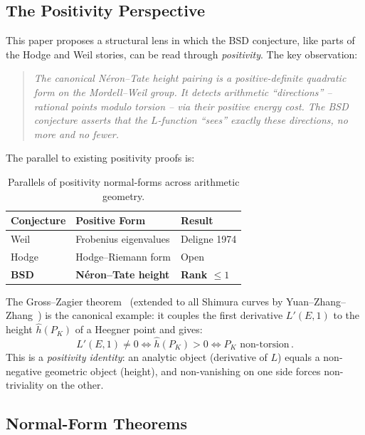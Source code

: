 \documentclass[aps,prd,twocolumn,superscriptaddress,nofootinbib,floatfix]{revtex4-2}
\theoremstyle{definition}
\theoremstyle{remark}
\begin{document}
\subsection{The Positivity Perspective}

This paper proposes a structural lens in which the BSD conjecture, like parts of the Hodge and Weil stories, can be read through \textit{positivity}. The key observation:

\begin{quote}
\textit{The canonical Néron--Tate height pairing is a positive-definite quadratic form on the Mordell\allowbreak--\allowbreak Weil group. It detects arithmetic ``directions'' -- rational points modulo torsion -- via their positive energy cost. The BSD conjecture asserts that the $L$-function ``sees'' exactly these directions, no more and no fewer.}
\end{quote}

The parallel to existing positivity proofs is:

\begin{table}[htbp]
\centering
\caption{Parallels of positivity normal-forms across arithmetic geometry.}
\label{tab:positivity_parallels}
\begin{tabular*}{\columnwidth}{@{\extracolsep{\fill}}lll@{}}
\toprule
\textbf{Conjecture} & \textbf{Positive Form} & \textbf{Result} \\
\midrule
Weil & Frobenius eigenvalues & Deligne 1974 \\
\addlinespace
Hodge & Hodge--Riemann form & Open \\
\addlinespace
\textbf{BSD} & \textbf{Néron--Tate height} & \textbf{Rank $\leq 1$} \\
\bottomrule
\end{tabular*}
\end{table}

The Gross--Zagier theorem~\cite{GrossZagier1986} (extended to all Shimura curves by Yuan--Zhang--Zhang~\cite{YZZ2013}) is the canonical example: it couples the first derivative $L'(E,1)$ to the height $\hat{h}(P_K)$ of a Heegner point and gives:
\begin{equation}
L'(E,1) \neq 0 \iff \hat{h}(P_K) > 0 \iff P_K \text{ non-torsion}\,.
\end{equation}
This is a \textit{positivity identity}: an analytic object (derivative of $L$) equals a non-negative geometric object (height), and non-vanishing on one side forces non-triviality on the other.

\subsection{Normal-Form Theorems}
\end{document}
